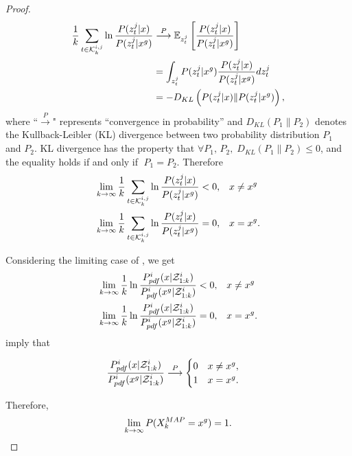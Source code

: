 \begin{proof}
		\small\begin{subequations}\label{eqn:cmp_lim2}
			\begin{align}
			\frac{1}{k}\sum\limits_{t\in\mathcal{K}^{i,j}_{k}}\ln\frac{P(z^j_t|x)}{P(z^j_t|x^g)}&\overset{P}{\longrightarrow}\mathbb{E}_{z^j_t} \left[\frac{P(z^j_t|x)}{P(z^j_t|x^g)}\right]\\
			&=\int_{z^j_t} P(z^j_t|x^g)\frac{P(z^j_t|x)}{P(z^j_t|x^g)} dz^j_t\\
			&=-D_{KL}\left(P(z^j_t|x)\|P(z^j_t|x^g)\right),
			\end{align}
		\end{subequations}\normalsize		
		where ``$\overset{P}{\longrightarrow}$" represents ``convergence in probability'' and $D_{KL}(P_1\|P_2)$ denotes the Kullback-Leibler (KL) divergence between two probability distribution $P_1$ and $P_2$.
		KL divergence has the property that $\forall P_1,\,P_2, \; D_{KL}(P_1\|P_2)\leq 0$, and the equality holds if and only if $\; P_1=P_2.$ Therefore
		\small\begin{align*}
		\lim\limits_{k\rightarrow \infty}\frac{1}{k}\sum\limits_{t\in\mathcal{K}^{i,j}_{k}}\ln\frac{P(z^j_t|x)}{P(z^j_t|x^g)}<0,&\quad x\neq x^g\\
		\lim\limits_{k\rightarrow \infty}\frac{1}{k}\sum\limits_{t\in\mathcal{K}^{i,j}_{k}}\ln\frac{P(z^j_t|x)}{P(z^j_t|x^g)}=0,&\quad x= x^g.
		\end{align*}\normalsize
		
		Considering the limiting case of , we get
		\small\begin{align}
		\lim\limits_{k\rightarrow \infty}\frac{1}{k}\ln\frac{P^i_{pdf}(x|\mathcal{Z}^i_{1:k})}{P^i_{pdf}(x^g|\mathcal{Z}^i_{1:k})}<0,&\quad x\neq x^g\label{subeqn:limit1}\\
		\lim\limits_{k\rightarrow \infty}\frac{1}{k}\ln\frac{P^i_{pdf}(x|\mathcal{Z}^i_{1:k})}{P^i_{pdf}(x^g|\mathcal{Z}^i_{1:k})}=0,&\quad x= x^g\label{subeqn:limit2}.
		\end{align}\normalsize
		 imply that
		
		\small\begin{equation*}
		\frac{P^i_{pdf}(x|\mathcal{Z}^i_{1:k})}{P^i_{pdf}(x^g|\mathcal{Z}^i_{1:k})}\overset{P}{\longrightarrow}
		\begin{cases}
		0\quad x\neq x^g,\\
		1\quad x= x^g.
		\end{cases}		
		\end{equation*}\normalsize
		
		Therefore,
		\small\begin{equation*}
		\lim\limits_{k\rightarrow \infty}
		P(X_k^{MAP}=x^g)=1.
		\end{equation*}\normalsize		
		
	\end{proof}
	
